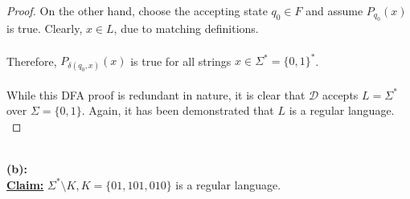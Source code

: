 \documentclass[12pt]{article}
\begin{document}
\begin{proof}
    On the other hand, choose the accepting state $q_0 \in F$ and assume $P_{q_0}(x)$ is true. Clearly, $x \in L$, due to matching definitions. \\
    \\
    Therefore, $P_{\delta(q_0, x)}(x)$ is true for all strings $x \in \Sigma^* = \{0, 1\}^*$. \\
    \\
    While this DFA proof is redundant in nature, it is clear that $\mathcal{D}$ accepts $L = \Sigma^*$ over $\Sigma = \{0, 1\}$. Again, it has been demonstrated that $L$ is a regular language. \\
\end{proof}
\leavevmode\\
\textbf{(b):} \\
\textbf{\underline{Claim:}} $\Sigma^* \setminus K, K = \{ 01, 101, 010 \}$ is a regular language.
\end{document}
